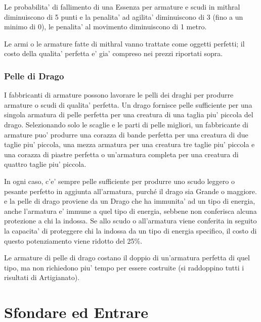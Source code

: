 \documentclass[a4paper,11pt,twoside,openany]{book}
\begin{document}
{		Le probabilita' di fallimento di una Essenza per armature e scudi in mithral diminuiscono di 5 punti e la penalita' ad agilita' diminuiscono di 3 (fino a un minimo di 0), le penalita' al movimento diminuiscono di 1 metro.
		
		Le armi o le armature fatte di mithral vanno trattate come oggetti perfetti; il costo della qualita' perfetta e' gia' compreso nei prezzi riportati sopra.
		
		\subsubsection{Pelle di Drago}
		
		\label{pelle-di-drago}
		
		I fabbricanti di armature possono lavorare le pelli dei draghi per produrre armature o scudi di qualita' perfetta.
		Un drago fornisce pelle sufficiente per una singola armatura di pelle perfetta per una creatura di una taglia piu' piccola del drago. Selezionando solo le scaglie e le parti di pelle migliori, un fabbricante di armature puo' produrre una corazza di bande perfetta per una creatura di due taglie piu' piccola, una mezza armatura per una creatura tre taglie piu' piccola e una corazza di piastre perfetta o un'armatura completa per una creatura di quattro taglie piu' piccola. 
		
		In ogni caso, c'e' sempre pelle sufficiente per produrre uno scudo leggero o pesante perfetto in aggiunta all'armatura, purché il drago sia Grande o maggiore. 
		e la pelle di drago proviene da un Drago che ha immunita' ad un tipo di energia, anche l'armatura e' immune a quel tipo di energia, sebbene non conferisca alcuna protezione a chi la indossa. Se allo scudo o all'armatura viene conferita in seguito la capacita' di proteggere chi la indossa da un tipo di energia specifico, il costo di questo potenziamento viene ridotto del 25\%.
		
		Le armature di pelle di drago costano il doppio di un'armatura perfetta di quel tipo, ma non richiedono piu' tempo per essere costruite (si raddoppino tutti i risultati di Artigianato).
		
		\pagebreak
		
		\section{Sfondare ed Entrare}
		
		\label{sfondare-ed-entrare}
		
}
\end{document}
